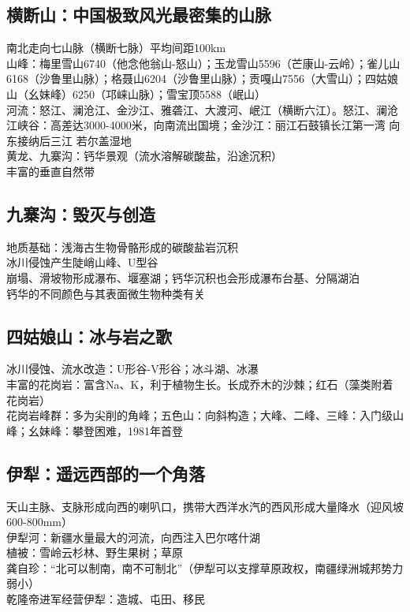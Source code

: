 \subsection*{横断山：中国极致风光最密集的山脉}

南北走向七山脉（横断七脉）平均间距100km\\
山峰：梅里雪山6740（他念他翁山-怒山）；玉龙雪山5596（芒康山-云岭）；雀儿山6168（沙鲁里山脉）；格聂山6204（沙鲁里山脉）；贡嘎山7556（大雪山）；四姑娘山（幺妹峰）6250（邛崃山脉）；雪宝顶5588（岷山）\\
河流：怒江、澜沧江、金沙江、雅砻江、大渡河、岷江（横断六江）。怒江、澜沧江峡谷：高差达3000-4000米，向南流出国境；金沙江：丽江石鼓镇长江第一湾 向东接纳后三江
若尔盖湿地\\
黄龙、九寨沟：钙华景观（流水溶解碳酸盐，沿途沉积）\\
丰富的垂直自然带

\subsection*{九寨沟：毁灭与创造}

地质基础：浅海古生物骨骼形成的碳酸盐岩沉积\\
冰川侵蚀产生陡峭山峰、U型谷\\
崩塌、滑坡物形成瀑布、堰塞湖；钙华沉积也会形成瀑布台基、分隔湖泊\\
钙华的不同颜色与其表面微生物种类有关

\subsection*{四姑娘山：冰与岩之歌}

冰川侵蚀、流水改造：U形谷-V形谷；冰斗湖、冰瀑\\
丰富的花岗岩：富含Na、K，利于植物生长。长成乔木的沙棘；红石（藻类附着花岗岩）\\
花岗岩峰群：多为尖削的角峰；五色山：向斜构造；大峰、二峰、三峰：入门级山峰；幺妹峰：攀登困难，1981年首登

\subsection*{伊犁：遥远西部的一个角落}

天山主脉、支脉形成向西的喇叭口，携带大西洋水汽的西风形成大量降水（迎风坡600-800mm）\\
伊犁河：新疆水量最大的河流，向西注入巴尔喀什湖\\
植被：雪岭云杉林、野生果树；草原\\
龚自珍：“北可以制南，南不可制北”（伊犁可以支撑草原政权，南疆绿洲城邦势力弱小）\\
乾隆帝进军经营伊犁：造城、屯田、移民


